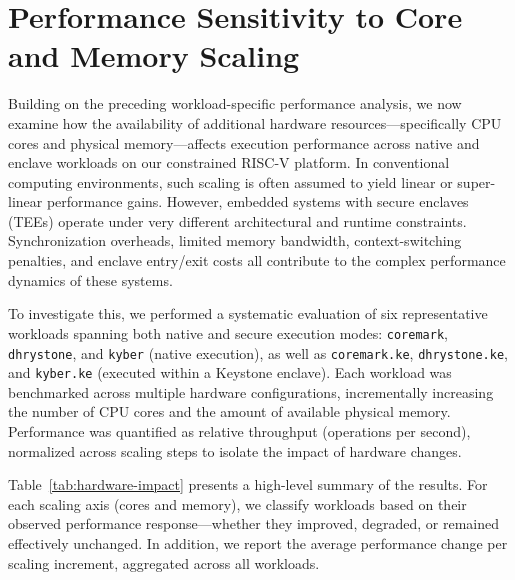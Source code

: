 \section{Performance Sensitivity to Core and Memory Scaling}
\label{sec:hardware-impact}

Building on the preceding workload-specific performance analysis, we now examine how the availability of additional hardware resources—specifically CPU cores and physical memory—affects execution performance across native and enclave workloads on our constrained RISC-V platform. In conventional computing environments, such scaling is often assumed to yield linear or super-linear performance gains. However, embedded systems with secure enclaves (TEEs) operate under very different architectural and runtime constraints. Synchronization overheads, limited memory bandwidth, context-switching penalties, and enclave entry/exit costs all contribute to the complex performance dynamics of these systems.

To investigate this, we performed a systematic evaluation of six representative workloads spanning both native and secure execution modes: \texttt{coremark}, \texttt{dhrystone}, and \texttt{kyber} (native execution), as well as \texttt{coremark.ke}, \texttt{dhrystone.ke}, and \texttt{kyber.ke} (executed within a Keystone enclave). Each workload was benchmarked across multiple hardware configurations, incrementally increasing the number of CPU cores and the amount of available physical memory. Performance was quantified as relative throughput (operations per second), normalized across scaling steps to isolate the impact of hardware changes.

Table~\ref{tab:hardware-impact} presents a high-level summary of the results. For each scaling axis (cores and memory), we classify workloads based on their observed performance response—whether they improved, degraded, or remained effectively unchanged. In addition, we report the average performance change per scaling increment, aggregated across all workloads.

